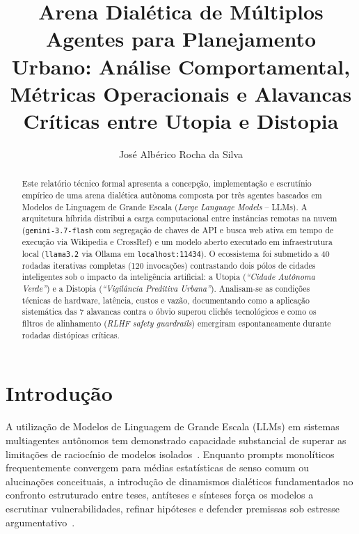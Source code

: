 \documentclass[runningheads]{llncs}
\begin{document}
\title{Arena Dial\'etica de M\'ultiplos Agentes para Planejamento Urbano: An\'alise Comportamental, M\'etricas Operacionais e Alavancas Cr\'iticas entre Utopia e Distopia}

\author{Jos\'e Alb\'erico Rocha da Silva}

\maketitle

\begin{abstract}
Este relat\'orio t\'ecnico formal apresenta a concep\c{c}\~ao, implementa\c{c}\~ao e escrut\'inio emp\'irico de uma arena dial\'etica aut\^onoma composta por tr\^es agentes baseados em Modelos de Linguagem de Grande Escala (\emph{Large Language Models} -- LLMs). A arquitetura h\'ibrida distribui a carga computacional entre inst\^ancias remotas na nuvem (\texttt{gemini-3.7-flash} com segrega\c{c}\~ao de chaves de API e busca web ativa em tempo de execu\c{c}\~ao via Wikipedia e CrossRef) e um modelo aberto executado em infraestrutura local (\texttt{llama3.2} via Ollama em \texttt{localhost:11434}). O ecossistema foi submetido a 40 rodadas iterativas completas (120 invoca\c{c}\~oes) contrastando dois p\'olos de cidades inteligentes sob o impacto da intelig\^encia artificial: a Utopia (\emph{``Cidade Aut\^onoma Verde''}) e a Distopia (\emph{``Vigil\^ancia Preditiva Urbana''}). Analisam-se as condi\c{c}\~oes t\'ecnicas de hardware, lat\^encia, custos e vaz\~ao, documentando como a aplica\c{c}\~ao sistem\'atica das 7 alavancas contra o \'obvio superou clich\^es tecnol\'ogicos e como os filtros de alinhamento (\emph{RLHF safety guardrails}) emergiram espontaneamente durante rodadas dist\'opicas cr\'iticas.
\end{abstract}

\section{Introdu\c{c}\~ao}

A utiliza\c{c}\~ao de Modelos de Linguagem de Grande Escala (LLMs) em sistemas multiagentes aut\^onomos tem demonstrado capacidade substancial de superar as limita\c{c}\~oes de racioc\'inio de modelos isolados~\cite{park2023generative,du2023improving}. Enquanto prompts monol\'iticos frequentemente convergem para m\'edias estat\'isticas de senso comum ou alucina\c{c}\~oes conceituais, a introdu\c{c}\~ao de dinamismos dial\'eticos fundamentados no confronto estruturado entre teses, ant\'iteses e s\'inteses for\c{c}a os modelos a escrutinar vulnerabilidades, refinar hip\'oteses e defender premissas sob estresse argumentativo~\cite{liang2023encouraging}.
\end{document}
